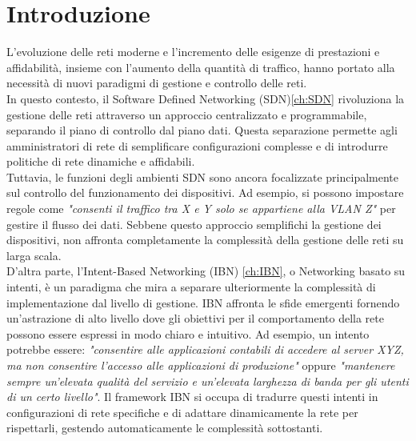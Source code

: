 \chapter{Introduzione}
L'evoluzione delle reti moderne e l'incremento delle esigenze di prestazioni e affidabilità, insieme con l'aumento della quantità di traffico, 
hanno portato alla necessità di nuovi paradigmi di gestione e controllo delle reti.
\\In questo contesto, il Software Defined Networking (SDN)\ref{ch:SDN} rivoluziona la gestione delle reti attraverso un approccio centralizzato e programmabile, separando il piano di controllo dal piano dati.
Questa separazione permette agli amministratori di rete di semplificare configurazioni complesse e di introdurre politiche di rete dinamiche e affidabili.
\\Tuttavia, le funzioni degli ambienti SDN sono ancora focalizzate principalmente sul controllo del funzionamento dei dispositivi. Ad esempio, si possono impostare regole come \textit{"consenti il traffico tra X e Y solo se appartiene alla VLAN Z"} per gestire il flusso dei dati. 
Sebbene questo approccio semplifichi la gestione dei dispositivi, non affronta completamente la complessità della gestione delle reti su larga scala.
\\D'altra parte, l’Intent-Based Networking (IBN) \ref{ch:IBN}, o Networking basato su intenti, è un paradigma che mira a separare ulteriormente la complessità di implementazione dal livello di gestione. 
IBN affronta le sfide emergenti fornendo un'astrazione di alto livello dove gli obiettivi per il comportamento della rete possono essere espressi in modo chiaro e intuitivo.
Ad esempio, un intento potrebbe essere: \textit{"consentire alle applicazioni contabili di accedere al server XYZ, ma non consentire l’accesso alle applicazioni di produzione"} oppure
\textit{"mantenere sempre un'elevata qualità del servizio e un'elevata larghezza di banda per gli utenti di un certo livello"}.
 Il framework IBN si occupa di tradurre questi intenti in configurazioni di rete specifiche e di adattare dinamicamente la rete per rispettarli, gestendo automaticamente le complessità sottostanti.
